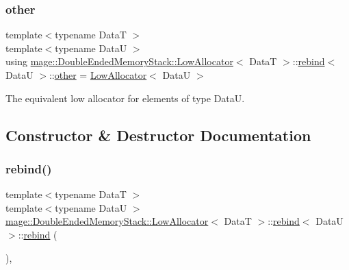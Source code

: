 \subsubsection{\texorpdfstring{other}{other}}
{\footnotesize\ttfamily template$<$typename DataT $>$ \\
template$<$typename DataU $>$ \\
using \hyperlink{structmage_1_1_double_ended_memory_stack_1_1_low_allocator}{mage\+::\+Double\+Ended\+Memory\+Stack\+::\+Low\+Allocator}$<$ DataT $>$\+::\hyperlink{structmage_1_1_double_ended_memory_stack_1_1_low_allocator_1_1rebind}{rebind}$<$ DataU $>$\+::\hyperlink{structmage_1_1_double_ended_memory_stack_1_1_low_allocator_1_1rebind_ad2d30609df172b2f8759819439a41bfd}{other} =  \hyperlink{structmage_1_1_double_ended_memory_stack_1_1_low_allocator}{Low\+Allocator}$<$ DataU $>$}

The equivalent low allocator for elements of type {\ttfamily DataU}. 

\subsection{Constructor \& Destructor Documentation}
\hypertarget{structmage_1_1_double_ended_memory_stack_1_1_low_allocator_1_1rebind_a0614241d4b05d08ab4bba55ca793bf5c}{}\label{structmage_1_1_double_ended_memory_stack_1_1_low_allocator_1_1rebind_a0614241d4b05d08ab4bba55ca793bf5c} 
\subsubsection{\texorpdfstring{rebind()}{rebind()}\hspace{0.1cm}{\footnotesize\ttfamily [1/3]}}
{\footnotesize\ttfamily template$<$typename DataT $>$ \\
template$<$typename DataU $>$ \\
\hyperlink{structmage_1_1_double_ended_memory_stack_1_1_low_allocator}{mage\+::\+Double\+Ended\+Memory\+Stack\+::\+Low\+Allocator}$<$ DataT $>$\+::\hyperlink{structmage_1_1_double_ended_memory_stack_1_1_low_allocator_1_1rebind}{rebind}$<$ DataU $>$\+::\hyperlink{structmage_1_1_double_ended_memory_stack_1_1_low_allocator_1_1rebind}{rebind} (\begin{DoxyParamCaption}{ }\end{DoxyParamCaption})\hspace{0.3cm}{\ttfamily [private]}, {\ttfamily [delete]}}

